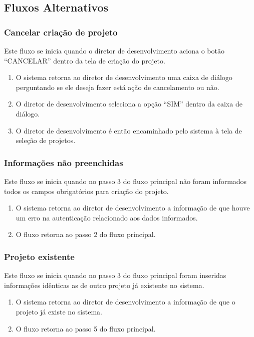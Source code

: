 \subsection{Fluxos Alternativos}

\subsubsection{Cancelar criação de projeto}
Este fluxo se inicia quando o diretor de desenvolvimento aciona o botão “CANCELAR” dentro da tela de criação do projeto.

\begin{enumerate}
  \item O sistema retorna ao diretor de desenvolvimento uma caixa de diálogo perguntando se ele deseja fazer está ação de cancelamento ou não.
  \item O diretor de desenvolvimento seleciona a opção “SIM” dentro da caixa de diálogo.
  \item O diretor de desenvolvimento é então encaminhado pelo sistema à tela de seleção de projetos.
\end{enumerate}

\subsubsection{Informações não preenchidas}
Este fluxo se inicia quando no passo 3 do fluxo principal não foram informados todos os campos obrigatórios para criação do projeto.

\begin{enumerate}
  \item O sistema retorna ao diretor de desenvolvimento a informação de que houve um erro na autenticação relacionado aos dados informados.
  \item O fluxo retorna ao passo 2 do fluxo principal.
\end{enumerate}

\subsubsection{Projeto existente}
Este fluxo se inicia quando no passo 3 do fluxo principal foram inseridas informações idênticas as de outro projeto já existente no sistema.

\begin{enumerate}
  \item O sistema retorna ao diretor de desenvolvimento a informação de que o projeto já existe no sistema.
  \item O fluxo retorna ao passo 5 do fluxo principal.
\end{enumerate}



